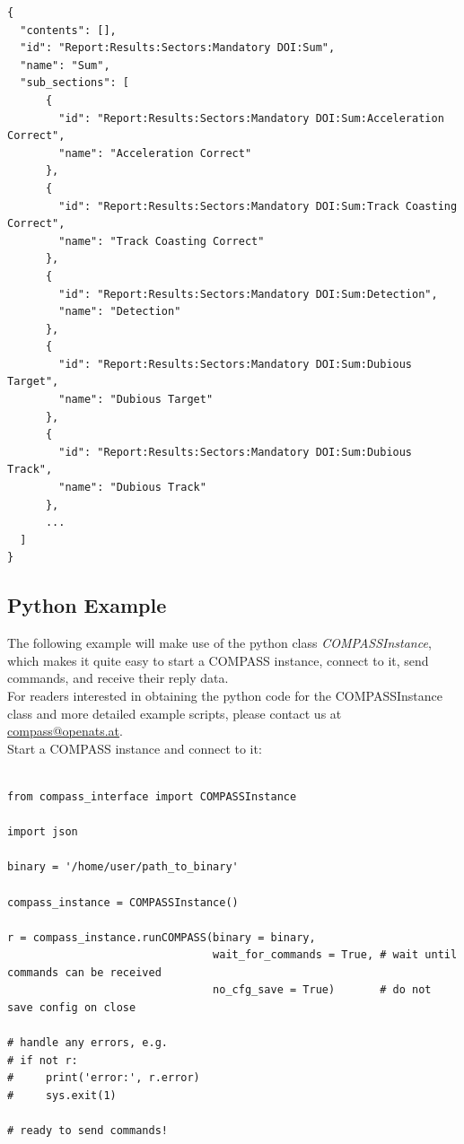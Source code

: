 \begin{lstlisting}[basicstyle=\tiny\ttfamily]
{
  "contents": [],
  "id": "Report:Results:Sectors:Mandatory DOI:Sum",
  "name": "Sum",
  "sub_sections": [
      {
        "id": "Report:Results:Sectors:Mandatory DOI:Sum:Acceleration Correct",
        "name": "Acceleration Correct"
      },
      {
        "id": "Report:Results:Sectors:Mandatory DOI:Sum:Track Coasting Correct",
        "name": "Track Coasting Correct"
      },
      {
        "id": "Report:Results:Sectors:Mandatory DOI:Sum:Detection",
        "name": "Detection"
      },
      {
        "id": "Report:Results:Sectors:Mandatory DOI:Sum:Dubious Target",
        "name": "Dubious Target"
      },
      {
        "id": "Report:Results:Sectors:Mandatory DOI:Sum:Dubious Track",
        "name": "Dubious Track"
      },
      ...
  ]
}
\end{lstlisting}

\subsection{Python Example}
\label{sec:rtcommand_python_example}

The following example will make use of the python class \textit{COMPASSInstance}, 
which makes it quite easy to start a COMPASS instance, connect to it, send commands,
and receive their reply data. \\

For readers interested in obtaining the python code for the COMPASSInstance class and 
more detailed example scripts, please contact us at \href{mailto:compass@openats.at}{compass@openats.at}. \\

Start a COMPASS instance and connect to it:

\begin{lstlisting}[basicstyle=\tiny\ttfamily]

from compass_interface import COMPASSInstance

import json

binary = '/home/user/path_to_binary'

compass_instance = COMPASSInstance()

r = compass_instance.runCOMPASS(binary = binary,
                                wait_for_commands = True, # wait until commands can be received
                                no_cfg_save = True)       # do not save config on close

# handle any errors, e.g.
# if not r:
#     print('error:', r.error)
#     sys.exit(1)

# ready to send commands!
\end{lstlisting}

